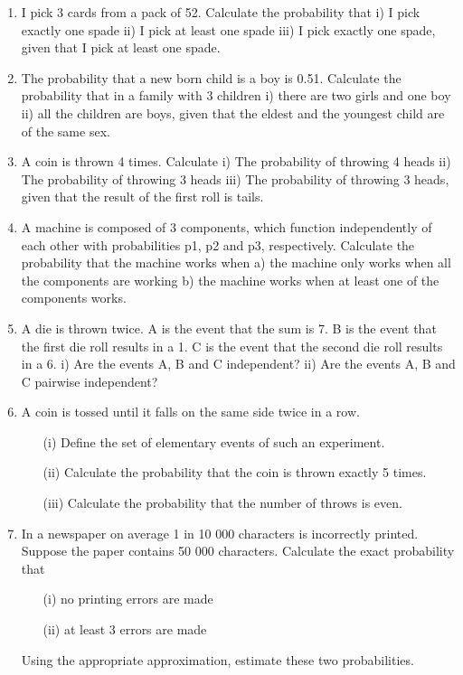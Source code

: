 \documentclass[a4paper,12pt]{article}
\begin{document}
\begin{enumerate}
	\item I pick 3 cards from a pack of 52. Calculate the probability that 
	i)	I pick exactly one spade
	ii)	I pick at least one spade
	iii)	I pick exactly one spade, given that I pick at least one spade.
	
\item The probability that a new born child is a boy is 0.51. Calculate the probability that in a family with 3 children
	i)	there are two girls and one boy
	ii)	all the children are boys, given that the eldest and the youngest child are of the same sex.
	
\item	A coin is thrown 4 times. Calculate 
	i)	The probability of throwing 4 heads
	ii)	The probability of throwing 3 heads 
	iii)	The probability of throwing 3 heads, given that the result of the first roll is tails.
	

	\item A machine is composed of 3 components, which function independently of each other with probabilities p1, p2 and p3, respectively. Calculate the probability that the machine works when
	a)	the machine only works when all the components are working
	b)	the machine works when at least one of the components works.
	
	\item  A die is thrown twice. A is the event that the sum is 7. B is the event that the first die roll results in a 1. C is the event that the second die roll results in a 6. 
	i)	Are the events A, B and C independent?
	ii)	Are the events A, B and C pairwise independent?
\item A coin is tossed until it falls on the same side twice in a row.
\begin{itemize}
	\item[(i)] Define the set of elementary events of such an experiment.
	\item[(ii)]  Calculate the probability that the coin is thrown exactly 5 times.
	\item[(iii)]  Calculate the probability that the number of throws is even.
\end{itemize}
\item	In a newspaper on average 1 in 10 000 characters is incorrectly printed. Suppose the paper contains 50 000 characters. Calculate the exact probability that 
 \begin{itemize}
\item[(i)]	no printing errors are made
\item[(ii)]	at least 3 errors are made
 \end{itemize}	
	Using the appropriate approximation, estimate these two probabilities. 


\end{enumerate}
\end{document}
